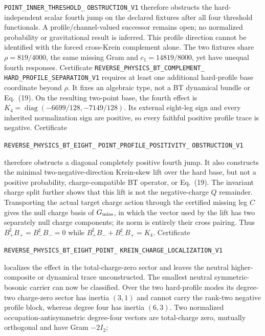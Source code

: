\documentclass[11pt]{article}
\theoremstyle{definition}
\theoremstyle{remark}
\begin{document}
\texttt{POINT\_INNER\_THRESHOLD\_}\allowbreak
\texttt{OBSTRUCTION\_V1}
therefore obstructs the hard-independent scalar fourth jump on the declared
fixtures after all four threshold functionals.  A profile/channel-valued
successor remains open; no normalized probability or gravitational result is
inferred.
This profile direction cannot be identified with the forced cross-Krein
complement alone.  The two fixtures share $\rho=819/4000$, the same missing
Gram and $c_1=14819/8000$, yet have unequal fourth responses.  Certificate
\texttt{REVERSE\_PHYSICS\_BT\_COMPLEMENT\_}\allowbreak
\texttt{HARD\_PROFILE\_SEPARATION\_V1}
requires at least one additional hard-profile base coordinate beyond $\rho$.
It fixes an algebraic type, not a BT dynamical bundle or Eq.~(19).
On the resulting two-point base, the fourth effect is
$K_4=\operatorname{diag}(-6699/128,-7149/128)$.  Its external eight-leg sign
and every inherited normalization sign are positive, so every faithful
positive profile trace is negative.  Certificate
\par\noindent
\texttt{REVERSE\_PHYSICS\_BT\_EIGHT\_}\allowbreak
\texttt{POINT\_PROFILE\_POSITIVITY\_}\allowbreak
\texttt{OBSTRUCTION\_V1}
\par\noindent
therefore obstructs a diagonal completely positive fourth jump.  It also
constructs the minimal two-negative-direction Krein-skew lift over the hard
base, but not a positive probability, charge-compatible BT operator, or
Eq.~(19).
The invariant charge split further shows that this lift is not the
negative-charge $Q$ remainder.  Transporting the actual target charge action
through the certified missing leg $C$ gives the null charge basis of
$G_{\rm miss}$, in which
the vector used by the lift has two separately null charge components; its
norm is entirely their cross pairing.  Thus
$B_+^\sharp B_+=B_-^\sharp B_-=0$ while
$B_+^\sharp B_-+B_-^\sharp B_+=K_4$.  Certificate
\par\noindent
\texttt{REVERSE\_PHYSICS\_BT\_EIGHT\_POINT\_}\allowbreak
\texttt{KREIN\_CHARGE\_LOCALIZATION\_V1}
\par\noindent
localizes the effect in the total-charge-zero sector and leaves the neutral
higher-composite or dynamical trace unconstructed.
The smallest neutral symmetric-bosonic carrier can now be classified.
Over the two hard-profile modes its degree-two charge-zero sector has inertia
$(3,1)$ and cannot carry the rank-two negative profile block, whereas degree
four has inertia $(6,3)$.  Two normalized occupation-antisymmetric degree-four
vectors are total-charge zero, mutually orthogonal and have Gram $-2I_2$;
\end{document}
